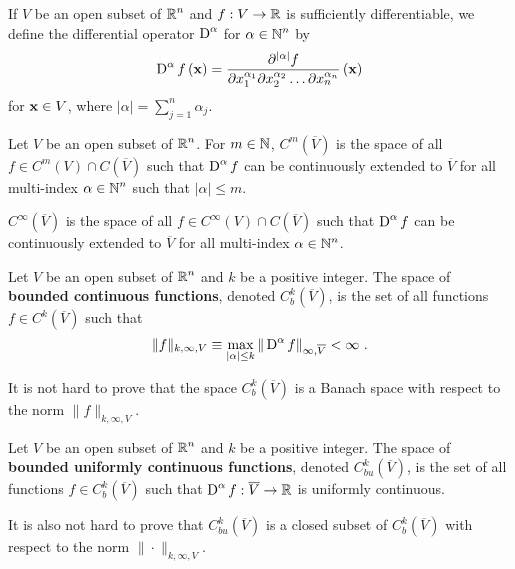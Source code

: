 If $V$ be an open subset of $\displaystyle \mathbb{R}^n$ and $f:V \to \mathbb{R}$ is
sufficiently differentiable, we define the differential operator
$\displaystyle \operatorname{D}^\alpha$ for $\displaystyle \alpha \in \mathbb{N}^n$
by
\[
\operatorname{D}^\alpha f\left(\mathbf{x}\right)
= \frac{\partial^{|\alpha|} f}{\partial x_1^{\alpha_1}
\partial x_2^{\alpha_2} \ldots \partial x_n^{\alpha_n}}\left(\mathbf{x}\right)
\]
for $\mathbf{x} \in V$, where $\displaystyle |\alpha| = \sum_{j=1}^n \alpha_j$.

\begin{defn*}
Let $V$ be an open subset of $\displaystyle \mathbb{R}^n$.  For $m\in \mathbb{N}$,
$\displaystyle C^m(\overline{V})$ is the space of all
$\displaystyle f \in C^m(V) \cap C(\overline{V})$ such that
$\displaystyle \operatorname{D}^\alpha f$ can be continuously extended
to $\overline{V}$ for
all multi-index $\displaystyle \alpha \in \mathbb{N}^n$ such that $|\alpha|\leq m$.

$\displaystyle C^\infty(\overline{V})$ is the space of all
$\displaystyle f \in C^\infty(V) \cap C(\overline{V})$ such that
$\displaystyle \operatorname{D}^\alpha f$ can be continuously extended to
$\overline{V}$ for all multi-index $\displaystyle \alpha \in \mathbb{N}^n$.
\end{defn*}

\begin{defn*}
Let $V$ be an open subset of $\displaystyle \mathbb{R}^n$ and $k$ be a
positive integer.  The space of {\bfseries bounded continuous
functions}, denoted
$\displaystyle C_b^k(\overline{V})$, is the set of all functions
$\displaystyle f\in C^k\left(\overline{V}\right)$ such that
\[
\|f\|_{k,\infty,V} \equiv \max_{|\alpha|\leq k}
\|\operatorname{D}^\alpha f\|_{\infty,\overline{V}} < \infty \ .
\]
\end{defn*}

It is not hard to prove that the space
$\displaystyle C^k_b(\overline{V})$ is a Banach space
with respect to the norm $\displaystyle \|f\|_{k,\infty,V}$.

\begin{defn*}
Let $V$ be an open subset of $\displaystyle \mathbb{R}^n$ and $k$ be a
positive integer.  The space of {\bfseries bounded uniformly continuous
functions}, denoted
$\displaystyle C_{bu}^k(\overline{V})$, is the set of all functions
$\displaystyle f\in C_b^k\left(\overline{V}\right)$ such that
$\displaystyle \operatorname{D}^\alpha f:\overline{V} \to \mathbb{R}$ is uniformly
continuous.
\end{defn*}

It is also not hard to prove that
$\displaystyle C_{bu}^k(\overline{V})$ is a closed subset of
$\displaystyle C_b^k\left(\overline{V}\right)$ with respect to the
norm $\|\cdot\|_{k,\infty,V}$.


